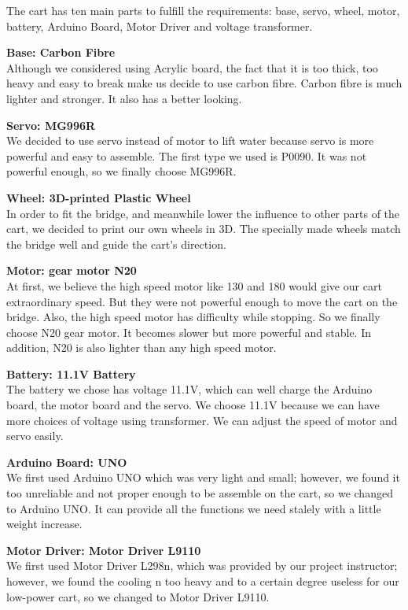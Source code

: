 The cart has ten main parts to fulfill the requirements: base, servo, wheel,
motor, battery, Arduino Board, Motor Driver and voltage transformer.

\bigskip
\noindent
\textbf{Base: Carbon Fibre} \\
\indent
Although we considered using Acrylic board, the fact that it is too thick, too
heavy and easy to break make us decide to use carbon fibre.
Carbon fibre is much lighter and stronger.
It also has a better looking. 

\bigskip
\noindent
\textbf{Servo: MG996R}  \\
\indent
We decided to use servo instead of motor to lift water because servo is more
powerful and easy to assemble. 
The first type we used is P0090.
It was not powerful enough, so we finally choose MG996R. 

\bigskip
\noindent
\textbf{Wheel: 3D-printed Plastic Wheel } \\
\indent
In order to fit the bridge, and meanwhile lower the influence to other parts of
the cart, we decided to print our own wheels in 3D.
The specially made wheels match the bridge well and guide the cart’s direction.

\bigskip
\noindent
\textbf{Motor:  gear motor N20 } \\
\indent
At first, we believe the high speed motor like 130 and 180 would give our cart
extraordinary speed.
But they were not powerful enough to move the cart on the bridge.
Also, the high speed motor has difficulty while stopping.
So we finally choose N20 gear motor.
It becomes slower but more powerful and stable.
In addition, N20 is also lighter than any high speed motor.  

\bigskip
\noindent
\textbf{Battery: 11.1V Battery } \\
\indent
The battery we chose has voltage 11.1V, which can well charge the Arduino board,
the motor board and the servo.
We choose 11.1V because we can have more choices of voltage using transformer.
We can adjust the speed of motor and servo easily.  

\bigskip
\noindent
\textbf{Arduino Board: UNO } \\
\indent
We first used Arduino UNO which was very light and small; however, we found it
too unreliable and not proper enough to be assemble on the cart, so we changed
to Arduino UNO.
It can provide all the functions we need stalely with a little weight increase.

\bigskip
\noindent
\textbf{Motor Driver: Motor Driver L9110 } \\
\indent
We first used Motor Driver L298n, which was provided by our project instructor;
however, we found the cooling n too heavy and to a certain degree useless for
our low-power cart, so we changed to Motor Driver L9110.

